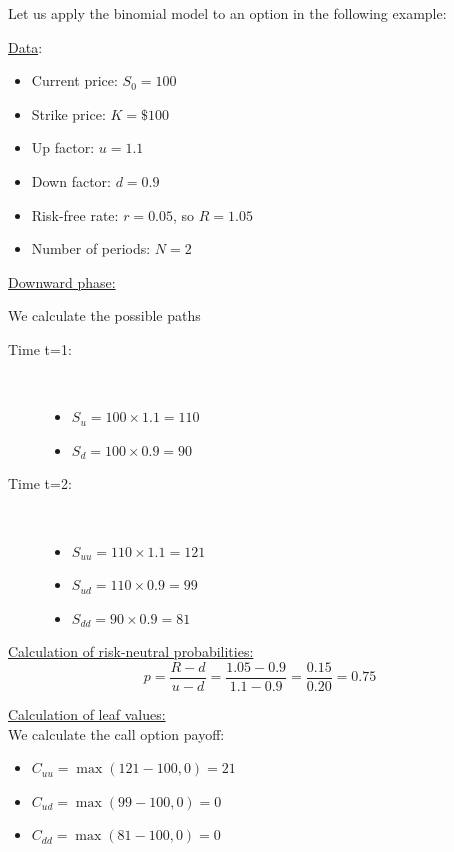 Let us apply the binomial model to an option in the following example:
\vspace{0.1cm}

\underline{Data}:
\begin{itemize}
    \item Current price: $S_0 = 100$
    \item Strike price: $K = \$100$
    \item Up factor: $u = 1.1$
    \item Down factor: $d = 0.9$
    \item Risk-free rate: $r = 0.05$, so $R=1.05$
    \item Number of periods: $N=2$
\end{itemize}

\vspace{0.1cm}

\underline{Downward phase:}

We calculate the possible paths
\begin{description}
    \item[Time t=1:] ~\
    \begin{itemize}
        \item $S_u = 100 \times 1.1 = 110$
        \item $S_d = 100 \times 0.9 = 90$
    \end{itemize}
    \item[Time t=2:] ~\
    \begin{itemize}
        \item $S_{uu} = 110 \times 1.1 = 121$
        \item $S_{ud} = 110 \times 0.9 = 99$
        \item $S_{dd} = 90 \times 0.9 = 81$
    \end{itemize}
\end{description}

\vspace{0.1cm}

\underline{Calculation of risk-neutral probabilities:}
$$p = \frac{R - d}{u - d} = \frac{1.05 - 0.9}{1.1 - 0.9} = \frac{0.15}{0.20} = 0.75$$

\vspace{0.1cm}

\underline{Calculation of leaf values:} \\
We calculate the call option payoff:
\begin{itemize}
    \item $C_{uu} = \max(121 - 100, 0) = 21$
    \item $C_{ud} = \max(99 - 100, 0) = 0$
    \item $C_{dd} = \max(81 - 100, 0) = 0$
\end{itemize}

